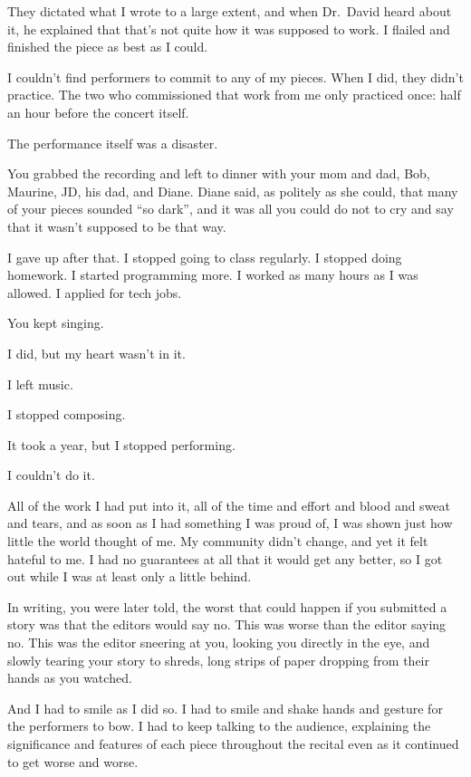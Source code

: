 \begin{leftcolumn}
They dictated what I wrote to a large extent, and when Dr.~David heard about it, he explained that that's not quite how it was supposed to work. I flailed and finished the piece as best as I could.

I couldn't find performers to commit to any of my pieces. When I did, they didn't practice. The two who commissioned that work from me only practiced once: half an hour before the concert itself.

The performance itself was a disaster.

\begin{ally}
You grabbed the recording and left to dinner with your mom and dad, Bob, Maurine, JD, his dad, and Diane. Diane said, as politely as she could, that many of your pieces sounded ``so dark'', and it was all you could do not to cry and say that it wasn't supposed to be that way.
\end{ally}
I gave up after that. I stopped going to class regularly. I stopped doing homework. I started programming more. I worked as many hours as I was allowed. I applied for tech jobs.

\begin{ally}
You kept singing.
\end{ally}
I did, but my heart wasn't in it.

I left music.

I stopped composing.

It took a year, but I stopped performing.

I couldn't do it.

All of the work I had put into it, all of the time and effort and blood and sweat and tears, and as soon as I had something I was proud of, I was shown just how little the world thought of me. My community didn't change, and yet it felt hateful to me. I had no guarantees at all that it would get any better, so I got out while I was at least only a little behind.

\begin{ally}
In writing, you were later told, the worst that could happen if you submitted a story was that the editors would say no. This was worse than the editor saying no. This was the editor sneering at you, looking you directly in the eye, and slowly tearing your story to shreds, long strips of paper dropping from their hands as you watched.
\end{ally}
And I had to smile as I did so. I had to smile and shake hands and gesture for the performers to bow. I had to keep talking to the audience, explaining the significance and features of each piece throughout the recital even as it continued to get worse and worse.


\end{leftcolumn}
